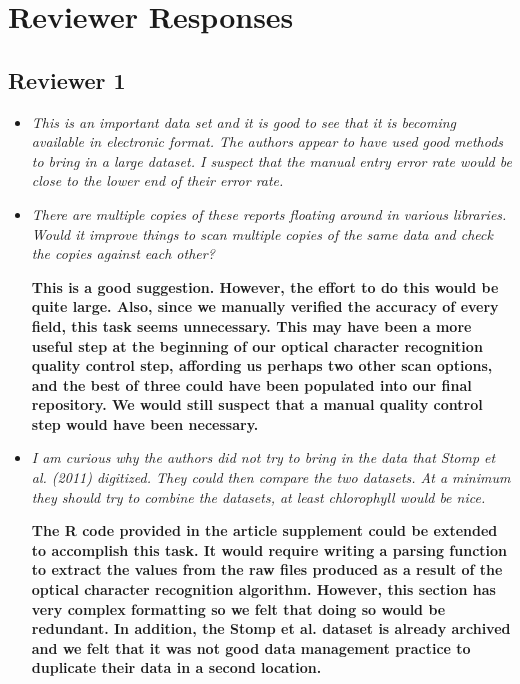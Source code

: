 \documentclass{article}
\begin{document}
\section*{Reviewer Responses}

\subsection{Reviewer 1}

\begin{itemize}
    
    \item \emph{This is an important data set and it is good to see that it is becoming available in electronic format. The authors appear to have used good methods to bring in a large dataset. I suspect that the manual entry error rate would be close to the lower end of their error rate.}

    \item \emph{There are multiple copies of these reports floating around in various libraries. Would it improve things to scan multiple copies of the same data and check the copies against each other?}

\textbf{This is a good suggestion. However, the effort to do this would be quite large.  Also, since we manually verified the accuracy of every field, this task seems unnecessary.  This may have been a more useful step at the beginning of our optical character recognition quality control step, affording us perhaps two other scan options, and the best of three could have been populated into our final repository.  We would still suspect that a manual quality control step would have been necessary.}

    \item \emph{I am curious why the authors did not try to bring in the data that Stomp et al. (2011) digitized. They could then compare the two datasets. At a minimum they should try to combine the datasets, at least chlorophyll would be nice.}

\textbf{The R code provided in the article supplement could be extended to accomplish this task. It would require writing a parsing function to extract the values from the raw files produced as a result of the optical character recognition algorithm. However, this section has very complex formatting so we felt that doing so would be redundant. In addition, the Stomp et al. dataset is already archived and we felt that it was not good data management practice to duplicate their data in a second location.}


\end{itemize}
\end{document}

